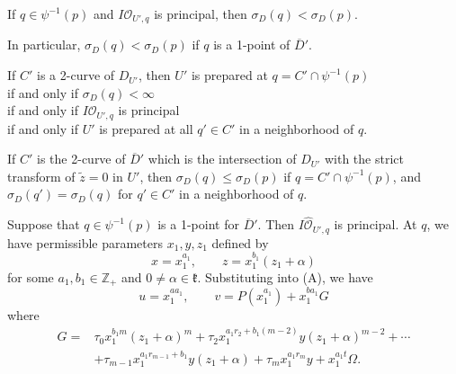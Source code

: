 \documentclass[11pt]{article}
\newcommand{\fk}{\mathfrak{k}}                 %
\newcommand{\OO}{\mathcal{O}}                  %
\newcommand{\OH}{\widehat{\mathcal{O}}}        %
\newcommand{\Dbar}{\overline{D}}               %
\newcommand{\ztil}{\widetilde{z}}              %
\begin{document}
\begin{list}{}{\setlength{\leftmargin}{4.5em}\setlength{\itemindent}{-4.5em}}
\item[(c11)] If $q \in \psi^{-1}(p)$ and $I\OO_{U',q}$ is principal, then
      $\sigma_D(q) < \sigma_D(p)$.
\item[] \hspace*{4.5em} In particular, $\sigma_D(q) < \sigma_D(p)$ if $q$ is a 1-point of
      $\Dbar'$.
\item[(c12)] If $C'$ is a 2-curve of $D_{U'}$, then $U'$ is prepared at
      $q = C' \cap \psi^{-1}(p)$\\
      \hspace*{4.5em} if and only if $\sigma_D(q) < \infty$\\
      \hspace*{4.5em} if and only if $I\OO_{U',q}$ is principal\\
      \hspace*{4.5em} if and only if $U'$ is prepared at all $q' \in C'$ in a
      neighborhood of $q$.
\item[(c13)] If $C'$ is the 2-curve of $\Dbar'$ which is the intersection of $D_{U'}$
      with the strict transform of $\ztil = 0$ in $U'$, then $\sigma_D(q) \leqslant
      \sigma_D(p)$ if $q = C' \cap \psi^{-1}(p)$, and $\sigma_D(q') = \sigma_D(q)$ for
      $q' \in C'$ in a neighborhood of $q$.
\end{list}

Suppose that $q \in \psi^{-1}(p)$ is a 1-point for $\Dbar'$. Then $I\OH_{U',q}$ is
principal. At $q$, we have permissible parameters $x_1, y, z_1$ defined by
\begin{equation}
\tag{c14}
x = x_1^{a_1}, \qquad z = x_1^{b_1} (z_1 + \alpha)
\end{equation}
for some $a_1, b_1 \in \mathbb{Z}_+$ and $0 \neq \alpha \in \fk$. Substituting into (A),
we have
\[
u = x_1^{a a_1}, \qquad v = P(x_1^{a_1}) + x_1^{b a_1} G
\]
where
\begin{align*}
G = {} & \tau_0 x_1^{b_1 m} (z_1 + \alpha)^m + \tau_2 x_1^{a_1 r_2 + b_1 (m-2)} y (z_1 + \alpha)^{m-2} + \cdots \\
       & + \tau_{m-1} x_1^{a_1 r_{m-1} + b_1} y (z_1 + \alpha) + \tau_m x_1^{a_1 r_m} y + x_1^{a_1 t} \Omega .
\end{align*}
\end{document}
